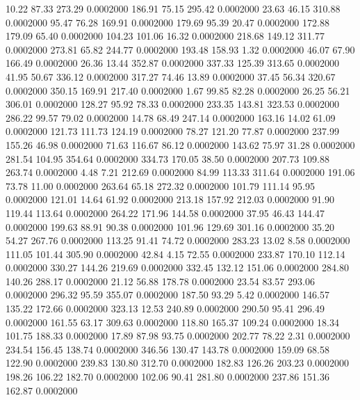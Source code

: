   10.22   87.33  273.29   0.0002000
 186.91   75.15  295.42   0.0002000
  23.63   46.15  310.88   0.0002000
  95.47   76.28  169.91   0.0002000
 179.69   95.39   20.47   0.0002000
 172.88  179.09   65.40   0.0002000
 104.23  101.06   16.32   0.0002000
 218.68  149.12  311.77   0.0002000
 273.81   65.82  244.77   0.0002000
 193.48  158.93    1.32   0.0002000
  46.07   67.90  166.49   0.0002000
  26.36   13.44  352.87   0.0002000
 337.33  125.39  313.65   0.0002000
  41.95   50.67  336.12   0.0002000
 317.27   74.46   13.89   0.0002000
  37.45   56.34  320.67   0.0002000
 350.15  169.91  217.40   0.0002000
   1.67   99.85   82.28   0.0002000
  26.25   56.21  306.01   0.0002000
 128.27   95.92   78.33   0.0002000
 233.35  143.81  323.53   0.0002000
 286.22   99.57   79.02   0.0002000
  14.78   68.49  247.14   0.0002000
 163.16   14.02   61.09   0.0002000
 121.73  111.73  124.19   0.0002000
  78.27  121.20   77.87   0.0002000
 237.99  155.26   46.98   0.0002000
  71.63  116.67   86.12   0.0002000
 143.62   75.97   31.28   0.0002000
 281.54  104.95  354.64   0.0002000
 334.73  170.05   38.50   0.0002000
 207.73  109.88  263.74   0.0002000
   4.48    7.21  212.69   0.0002000
  84.99  113.33  311.64   0.0002000
 191.06   73.78   11.00   0.0002000
 263.64   65.18  272.32   0.0002000
 101.79  111.14   95.95   0.0002000
 121.01   14.64   61.92   0.0002000
 213.18  157.92  212.03   0.0002000
  91.90  119.44  113.64   0.0002000
 264.22  171.96  144.58   0.0002000
  37.95   46.43  144.47   0.0002000
 199.63   88.91   90.38   0.0002000
 101.96  129.69  301.16   0.0002000
  35.20   54.27  267.76   0.0002000
 113.25   91.41   74.72   0.0002000
 283.23   13.02    8.58   0.0002000
 111.05  101.44  305.90   0.0002000
  42.84    4.15   72.55   0.0002000
 233.87  170.10  112.14   0.0002000
 330.27  144.26  219.69   0.0002000
 332.45  132.12  151.06   0.0002000
 284.80  140.26  288.17   0.0002000
  21.12   56.88  178.78   0.0002000
  23.54   83.57  293.06   0.0002000
 296.32   95.59  355.07   0.0002000
 187.50   93.29    5.42   0.0002000
 146.57  135.22  172.66   0.0002000
 323.13   12.53  240.89   0.0002000
 290.50   95.41  296.49   0.0002000
 161.55   63.17  309.63   0.0002000
 118.80  165.37  109.24   0.0002000
  18.34  101.75  188.33   0.0002000
  17.89   87.98   93.75   0.0002000
 202.77   78.22    2.31   0.0002000
 234.54  156.45  138.74   0.0002000
 346.56  130.47  143.78   0.0002000
 159.09   68.58  122.90   0.0002000
 239.83  130.80  312.70   0.0002000
 182.83  126.26  203.23   0.0002000
 198.26  106.22  182.70   0.0002000
 102.06   90.41  281.80   0.0002000
 237.86  151.36  162.87   0.0002000
